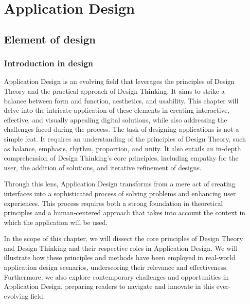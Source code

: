 \chapter{Application Design}\label{cap:intro}

\section{Element of design}

\subsection{Introduction in design}

\hspace{\parindent}Application Design is an evolving field that leverages the principles of Design Theory and the practical approach of Design Thinking. It aims to strike a balance between form and function, aesthetics, and usability. \cite{fling2009mobile} This chapter will delve into the intricate application of these elements in creating interactive, effective, and visually appealing digital solutions, while also addressing the challenges faced during the process.
\hspace{\parindent}The task of designing applications is not a simple feat. It requires an understanding of the principles of Design Theory, such as balance, emphasis, rhythm, proportion, and unity. It also entails an in-depth comprehension of Design Thinking's core principles, including empathy for the user, the addition of solutions, and iterative refinement of designs.

\hspace{\parindent}Through this lens, Application Design transforms from a mere act of creating interfaces into a sophisticated process of solving problems and enhancing user experiences. This process requires both a strong foundation in theoretical principles and a human-centered approach that takes into account the context in which the application will be used.

\hspace{\parindent}In the scope of this chapter, we will dissect the core principles of Design Theory and Design Thinking and their respective roles in Application Design. We will illustrate how these principles and methods have been employed in real-world application design scenarios, underscoring their relevance and effectiveness. Furthermore, we also explore contemporary challenges and opportunities in Application Design, preparing readers to navigate and innovate in this ever-evolving field.


